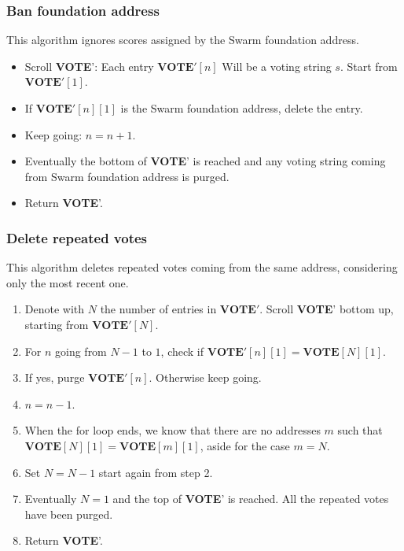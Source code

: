 \documentclass[submission, copyright,creativecommons,sharealike,noncommercial]{eptcs}
\newcommand{\Vote}{\textbf{VOTE}\xspace}
\begin{document}
	
\subsubsection{Ban foundation address}\label{subsubsec:Ban foundation address}
	This algorithm ignores scores assigned by the Swarm foundation address.
	\begin{itemize}
		\item Scroll \Vote': Each entry $\Vote'[n]$ Will be a voting string $s$. Start from $\Vote'[1]$.	
		\item If $\Vote'[n][1]$ is the Swarm foundation address, delete the entry.
		\item Keep going: $n = n+1$. 
		\item Eventually the bottom of \Vote' is reached and any voting string coming from Swarm foundation address is purged.
		\item Return \Vote'.
	\end{itemize}	

	
\subsubsection{Delete repeated votes}\label{subsubsec:Delete repeated votes}
	This algorithm deletes repeated votes coming from the same address, considering only the most recent one.
	\begin{enumerate}
		\item Denote with $N$ the number of entries in $\Vote'$. Scroll \Vote' bottom up, starting from $\Vote'[N]$.
		\item  For $n$ going from $N-1$ to $1$, check if $\Vote'[n][1] = \Vote[N][1]$.
		\item If yes, purge $\Vote'[n]$. Otherwise keep going.
		\item $n = n-1$.		
		\item When the for loop ends, we know that there are no addresses $m$ such that $\Vote[N][1] = \Vote[m][1]$, aside for the case $m=N$.
		\item Set $N = N-1$ start again from step 2.
		\item Eventually $N=1$ and the top of \Vote' is reached. All the repeated votes have been purged.
		\item Return \Vote'.
	\end{enumerate}
\end{document}
